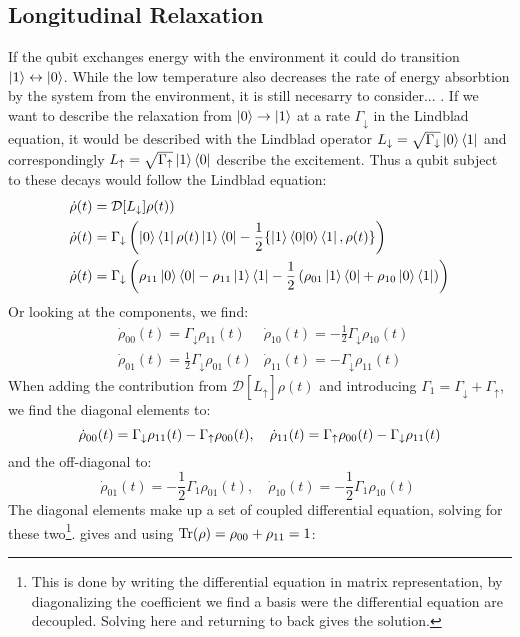 \subsection{Longitudinal Relaxation} 
If the qubit exchanges energy with the environment it could do transition $\ket{1} \leftrightarrow \ket{0}$. While the low temperature also decreases the rate of energy absorbtion by the system from the environment, it is still necesarry to consider... . If we want to describe the relaxation from $\ket{0}\to\ket{1}$ at a rate $\Gamma_\downarrow$ in the Lindblad equation, it would be described with the Lindblad operator $L_{\downarrow} = \sqrt{\Gamma_{\downarrow}} \ket{0}\bra{1}$ and correspondingly $L{_\uparrow} = \sqrt{\Gamma_{\uparrow}} \ket{1}\bra{0}$ describe the excitement. Thus a qubit subject to these decays would follow the Lindblad equation: 
\begin{align*}
    \dot{\rho}(t) &= \mathcal{D}[L_{\downarrow}]\rho(t)) \\
    \dot{\rho}(t) &= \Gamma_\downarrow\left(\ket{0}\bra{1} \rho(t) \ket{1}\bra{0} - \frac12 \{\ket{1}\bra{0}\ket{0}\bra{1}, \rho(t)\}\right) \\
    \dot{\rho}(t) &= \Gamma_\downarrow\left(\rho_{11}\ket{0}\bra{0} - \rho_{11} \ket{1}\bra{1} - \frac12\left(\rho_{01}\ket{1}\bra{0} + \rho_{10}\ket{0}\bra{1}\right)\right)
\end{align*}
Or looking at the components, we find:
\begin{align*}
    &\dot{\rho}_{00}(t) = \Gamma_\downarrow\rho_{11}(t)  &\dot{\rho}_{10}(t) = -\frac12\Gamma_\downarrow\rho_{10}(t)\; \\   
    &\dot{\rho}_{01}(t) = \frac12 \Gamma_\downarrow\rho_{01}(t)   &\dot{\rho}_{11}(t) = -\Gamma_\downarrow\rho_{11}(t)\;
\end{align*}
When adding the contribution from $\mathcal{D}[L_\uparrow]\rho(t)$ and introducing $\Gamma_1 = \Gamma_\downarrow + \Gamma_\uparrow$, we find the diagonal elements to:
\begin{equation}
    \dot{\rho}_{00}(t) = \Gamma_\downarrow\rho_{11}(t) - \Gamma_\uparrow\rho_{00}(t), \quad \dot{\rho}_{11}(t) = \Gamma_\uparrow\rho_{00}(t)-\Gamma_\downarrow\rho_{11}(t)\; \\   
\end{equation}
and the off-diagonal to:
\begin{equation}
    \dot{\rho}_{01}(t) = -\frac12 \Gamma_1\rho_{01}(t),  \quad \dot{\rho}_{10}(t) = -\frac12\Gamma_1\rho_{10}(t) \;
\end{equation}
The diagonal elements make up a set of coupled differential equation, solving for these two\footnote{This is done by writing the differential equation in matrix representation, by diagonalizing the coefficient we find a basis were the differential equation are decoupled. Solving here and returning to back gives the solution. }.  gives and using $\Tr(\rho) = \rho_{00} + \rho_{11} = 1$:


